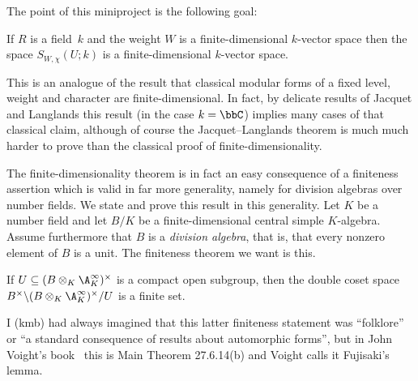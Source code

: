 The point of this miniproject is the following goal:

\begin{theorem}
  \label{TotallyDefiniteQuaternionAlgebra.AutomorphicForm.finiteDimensional}
  If $R$ is a field~$k$ and the weight $W$ is a finite-dimensional $k$-vector space
  then the space $S_{W,\chi}(U;k)$ is a finite-dimensional $k$-vector space.
\end{theorem}

This is an analogue of the result that classical modular forms of a fixed
level, weight and character are finite-dimensional. In fact, by delicate results
of Jacquet and Langlands this result (in the case $k=\bbC$) implies many cases of that classical claim,
although of course the Jacquet--Langlands theorem is much much harder to prove than the classical
proof of finite-dimensionality.

The finite-dimensionality theorem is in fact an easy consequence of a finiteness assertion
which is valid in far more generality, namely for division algebras over number fields.
We state and prove this result in this generality. Let $K$ be a number field and let $B/K$
be a finite-dimensional central simple $K$-algebra. Assume furthermore that $B$ is a
\emph{division algebra}, that is, that every nonzero element of $B$ is a unit. The finiteness
theorem we want is this.

\begin{theorem}
  \label{FiniteAdeleRing.DivisionAlgebra.finiteDoubleCoset}
  If $U\subseteq (B\otimes_K\A_K^\infty)^\times$ is a compact open subgroup,
  then the double coset space $B^\times\backslash(B\otimes_K\A_K^\infty)^\times/U$ is a
  finite set.
\end{theorem}

I (kmb) had always imagined that this latter finiteness statement was ``folklore'' or
``a standard consequence of results about automorphic forms'', but in John Voight's
book~\cite{voightbook} this is Main Theorem 27.6.14(b) and Voight calls it Fujisaki’s lemma.

